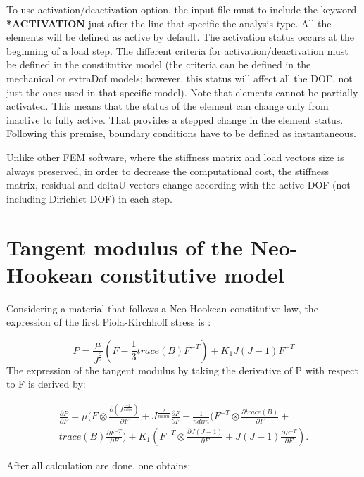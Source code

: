 \documentclass[oneside,11pt,times]{book}
\begin{document}
To use activation/deactivation option, the input file must to include the keyword \textbf{*ACTIVATION} just after the line that specific the analysis type. All the elements will be defined as active by default. The activation status occurs at the beginning of a load step. The different criteria for activation/deactivation must be defined in the constitutive model (the criteria can be defined in the mechanical or extraDof models; however, this status will affect all the DOF, not just the ones used in that specific model). Note that elements cannot be partially activated. This means that the status of the element can change only from inactive to fully active. That provides a stepped change in the element status. Following this premise, boundary conditions have to be defined as instantaneous.

Unlike other FEM software, where the stiffness matrix and load vectors size is always preserved, in order to decrease the computational cost, the stiffness matrix, residual and deltaU vectors change according with the active DOF (not including Dirichlet DOF) in each step.

\chapter[APPENDIX C]{Tangent modulus of the Neo-Hookean constitutive model}
Considering a material that follows a Neo-Hookean constitutive law, the expression of the first Piola-Kirchhoff stress is :

\begin{equation}
    P = \frac{\mu}{J^{\frac{2}{3}}}(F - \frac{1}{3}trace(B)F^{-T}) +K_{1}J(J-1)F^{-T}
    \end{equation}
The expression of the tangent modulus by taking the derivative of P with respect to F is derived by:

\begin{equation}
\begin{split}
\frac{\partial P}{\partial F} = \mu(F\otimes\frac{\partial(J^{\frac{-2}{ndim}})}{\partial F} + J^{\frac{2}{ndim}}\frac{\partial F}{\partial F} -  \frac{1}{ndim}(F^{-T}\otimes \frac{\partial trace(B)}{\partial F} +\\
trace(B)\frac{\partial F^{-T}}{\partial F}) +
K_{1}(F^{-T}\otimes\frac{\partial J(J-1)}{\partial F}+J(J-1)\frac{\partial F^{-T}}{\partial F}).
\end{split}
\end{equation}

After all calculation are done, one obtains:
\end{document}
